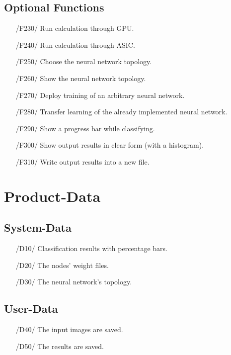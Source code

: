 \documentclass[parskip=full]{scrartcl}
\begin{document}
\subsection{Optional Functions} \label {ofunc}

\begin{itemize}
	\item[/F230/] Run calculation through GPU.
	\item[/F240/] Run calculation through ASIC.
	\item[/F250/] Choose the neural network topology.
	\item[/F260/] Show the neural network topology.
	\item[/F270/] Deploy training of an arbitrary neural network.
	\item[/F280/] Transfer learning of the already implemented neural network.
	\item[/F290/] Show a progress bar while classifying.
	\item[/F300/] Show output results in clear form (with a histogram).
	\item[/F310/] Write output results into a new file.
\end{itemize}

\pagebreak





\section{Product-Data}

\subsection{System-Data}

\begin{itemize}
	\item[/D10/] Classification results with percentage bars.
	\item[/D20/] The nodes' weight files.
	\item[/D30/] The neural network's topology.
\end{itemize}

\subsection{User-Data}

\begin{itemize}
	\item[/D40/] The input images are saved.
	\item[/D50/] The results are saved.
\end{itemize}
\end{document}
